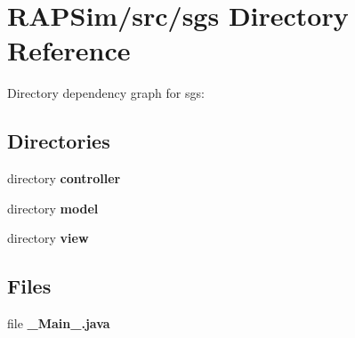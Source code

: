 \section{R\-A\-P\-Sim/src/sgs Directory Reference}
\label{dir_01a8656010585e8207038536504a8624}
Directory dependency graph for sgs\-:
\subsection*{Directories}
\begin{DoxyCompactItemize}
\item 
directory {\bf controller}
\item 
directory {\bf model}
\item 
directory {\bf view}
\end{DoxyCompactItemize}
\subsection*{Files}
\begin{DoxyCompactItemize}
\item 
file {\bf \-\_\-\-Main\-\_\-.\-java}
\end{DoxyCompactItemize}
